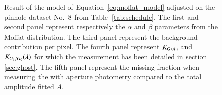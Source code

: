 \begin{figure}[h]
     \centering
     \caption{Result of the model of Equation~\ref{eq:moffat_model} adjusted on the \spinhole pinhole dataset No.~8 from Table~\ref{tab:schedule}. The first and second panel represent respectively the $\alpha$ and $\beta$ parameters from the Moffat distribution. The third panel represent the background contribution per pixel. The fourth panel represent $K_{G/A}$, and $K_{G_1/G_0}(\lambda)$ for which the measurement has been detailed in section \ref{sec:ghost}. The fifth panel represent the missing fraction when measuring the \spinhole with aperture photometry compared to the total amplitude fitted $A$.}
     \label{fig:result_params}
\end{figure}




